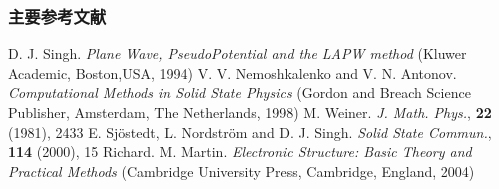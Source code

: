 \documentclass[cjk,slidestop,compress,mathserif,blue]{beamer}
\begin{document}
\appendix
\begin{thebibliography}{99}
\frame
{
\frametitle{主要参考文献}
{\small
        \textrm{D. J. Singh. \textit{Plane Wave, PseudoPotential and the LAPW method} (Kluwer Academic, Boston,USA, 1994)}
	\textrm{V. V. Nemoshkalenko and V. N. Antonov. \textit{Computational Methods in Solid State Physics} (Gordon and Breach Science Publisher, Amsterdam, The Netherlands, 1998)}
	\textrm{M. Weiner. \textit{J. Math. Phys.}, \textbf{22} (1981), 2433}
	\textrm{E. Sj\"ostedt, L. Nordstr\"om and D. J. Singh. \textit{Solid State Commun.}, \textbf{114} (2000), 15}
	\textrm{Richard. M. Martin. \textit{Electronic Structure: Basic Theory and Practical Methods} (Cambridge University Press, Cambridge, England, 2004)}
}
\nocite*{}
}
\end{thebibliography}


\end{document}

